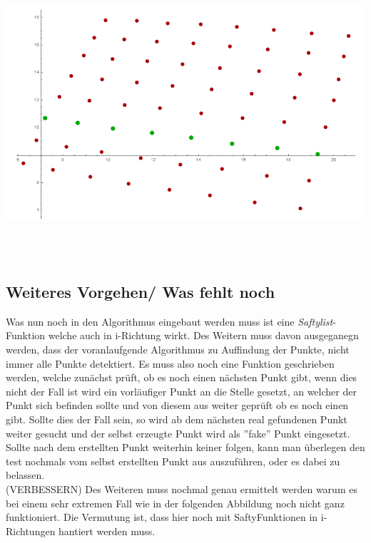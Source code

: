 \begin{minipage}{\linewidth}
	\centering
	\includegraphics[width=1\linewidth]{images/AlgTonnePers.png}
\end{minipage}\\\\


\subsection{Weiteres Vorgehen/ Was fehlt noch}

Was nun noch in den Algorithmus eingebaut werden muss ist eine \textit{Saftylist}-Funktion welche auch in i-Richtung wirkt. Des Weitern muss davon ausgeganegn werden, dass der voranlaufgende Algorithmus zu Auffindung der Punkte, nicht immer alle Punkte detektiert. Es muss also noch eine Funktion geschrieben werden, welche zunächst prüft, ob es noch einen nächsten Punkt gibt, wenn dies nicht der Fall ist wird ein vorläufiger Punkt an die Stelle gesetzt, an welcher der Punkt sich befinden sollte und von diesem aus weiter geprüft ob es noch einen gibt. Sollte dies der Fall sein, so wird ab dem nächsten real gefundenen Punkt weiter gesucht und der selbst erzeugte Punkt wird als ''fake'' Punkt eingesetzt. Sollte nach dem erstellten Punkt weiterhin keiner folgen, kann man überlegen den test nochmals vom selbst erstellten Punkt aus auszuführen, oder es dabei zu belassen. \\

(VERBESSERN)
Des Weiteren muss nochmal genau ermittelt werden warum es bei einem sehr extremen Fall wie in der folgenden Abbildung noch nicht ganz funktioniert. Die Vermutung ist, dass hier noch mit SaftyFunktionen in i-Richtungen hantiert werden muss. 

